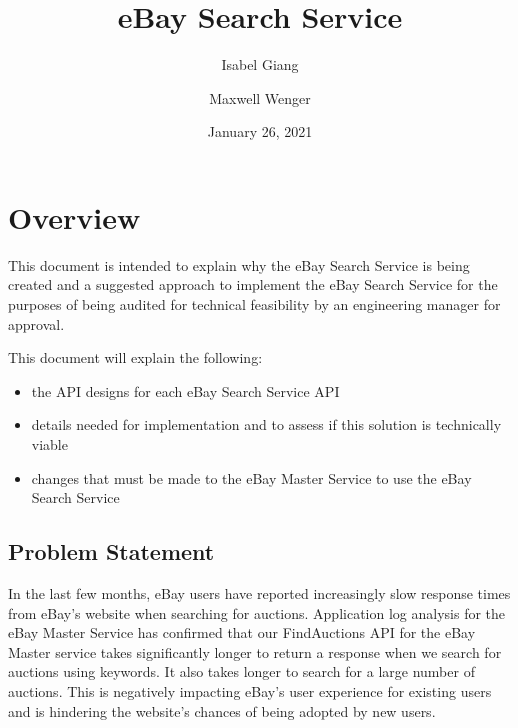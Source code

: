 \documentclass[12pt,a4paper]{article}
\title{eBay Search Service}
\author{Isabel Giang}
\author{Maxwell Wenger}
\affil{CSS490 Group Y4}
\date{January 26, 2021}
\begin{document}
\maketitle
\setcounter{tocdepth}{3}
\tableofcontents



\pagebreak
\section{Overview}

This document is intended to explain why the eBay Search Service is being created
and a suggested approach to implement the eBay Search Service for the purposes
of being audited for technical feasibility by an engineering manager for approval.

\vspace{\baselineskip}

This document will explain the following:

\begin{itemize}
    \item the API designs for each eBay Search Service API
    \item details needed for implementation and to assess if this solution is technically viable
    \item changes that must be made to the eBay Master Service to use the eBay Search Service
\end{itemize} 


\subsection{Problem Statement}
In the last few months, eBay users have reported increasingly slow response
times from eBay's website when searching for auctions. Application log analysis
for the eBay Master Service has confirmed that our FindAuctions API for the
eBay Master service takes significantly longer to return a response when we
search for auctions using keywords. It also takes longer to search for a large
number of auctions.
\vspace{\baselineskip}
This is negatively impacting eBay's user experience for existing users and is
hindering the website's chances of being adopted by new users.
\end{document}
